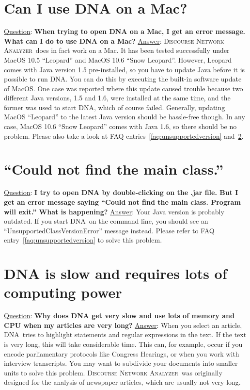 \documentclass[12pt,a4paper]{scrreprt}
\newcommand{\dnalong}{\textsc{Discourse} \textsc{Network} \textsc{Analyzer}}
\newcommand{\dnashort}{\textsc{DNA}}
\begin{document}
\section{Can I use DNA on a Mac?}
\underline{Question}: \textbf{When trying to open DNA on a Mac, I get an error message. What can I do to use DNA on a Mac?}
\vspace{0.3cm} \newline
\underline{Answer}: \dnalong\ does in fact work on a Mac. It has been tested successfully under MacOS 10.5 ``Leopard'' and MacOS 10.6 ``Snow Leopard''. However, Leopard comes with Java version 1.5 pre-installed, so you have to update Java before it is possible to run \dnashort. You can do this by executing the built-in software update of MacOS. One case was reported where this update caused trouble because two different Java versions, 1.5 and 1.6, were installed at the same time, and the former was used to start \dnashort, which of course failed. Generally, updating MacOS ``Leopard'' to the latest Java version should be hassle-free though. In any case, MacOS 10.6 ``Snow Leopard'' comes with Java 1.6, so there should be no problem. Please also take a look at FAQ entries~\ref{faq:unsupportedversion} and~\ref{faq:mainclass}.

\section{``Could not find the main class.''}\label{faq:mainclass}
\underline{Question}: \textbf{I try to open DNA by double-clicking on the .jar file. But I get an error message saying ``Could not find the main class. Program will exit.'' What is happening?}
\vspace{0.3cm} \newline
\underline{Answer}: Your Java version is probably outdated. If you start \dnashort\ on the command line, you should see an ``UnsupportedClassVersionError'' message instead. Please refer to FAQ entry~\ref{faq:unsupportedversion} to solve this problem.

\section{DNA is slow and requires lots of computing power}
\underline{Question}: \textbf{Why does DNA get very slow and use lots of memory and CPU when my articles are very long?}
\vspace{0.3cm} \newline
\underline{Answer}: When you select an article, \dnashort\ tries to highlight statements and regular expressions in the text. If the text is very long, this will take considerable time. This can, for example, occur if you encode parliamentary protocols like Congress Hearings, or when you work with interview transcripts. You may want to subdivide your documents into smaller units to solve this problem. \dnalong\ was originally designed for the analysis of newspaper articles, which are usually not very long.
\end{document}
